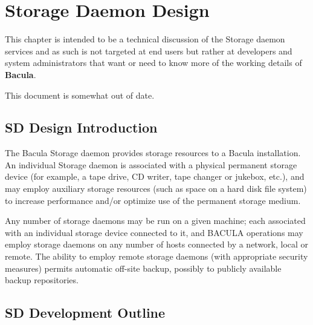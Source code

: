 
\chapter{Storage Daemon Design}
\label{_ChapterStart3}

This chapter is intended to be a technical discussion of the Storage daemon
services and as such is not targeted at end users but rather at developers and
system administrators that want or need to know more of the working details of
{\bf Bacula}.

This document is somewhat out of date.

\section{SD Design Introduction}

The Bacula Storage daemon provides storage resources to a Bacula installation.
An individual Storage daemon is associated with a physical permanent storage
device (for example, a tape drive, CD writer, tape changer or jukebox, etc.),
and may employ auxiliary storage resources (such as space on a hard disk file
system) to increase performance and/or optimize use of the permanent storage
medium.

Any number of storage daemons may be run on a given machine; each associated
with an individual storage device connected to it, and BACULA operations may
employ storage daemons on any number of hosts connected by a network, local or
remote. The ability to employ remote storage daemons (with appropriate
security measures) permits automatic off-site backup, possibly to publicly
available backup repositories.

\section{SD Development Outline}


